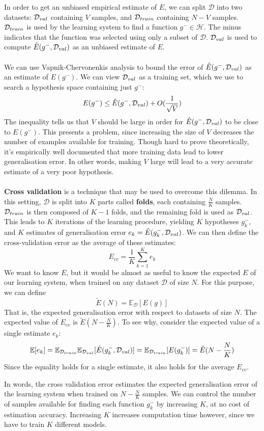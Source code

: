 In order to get an unbiased empirical estimate of $E$, we can split $\mathcal{D}$ into two datasets: $\mathcal{D}_{val}$ containing $V$ samples, and $\mathcal{D}_{train}$ containing $N - V$ samples. $\mathcal{D}_{train}$ is used by the learning system to find a function $g^- \in \mathcal{H}$. The minus indicates that the function was selected using only a subset of $\mathcal{D}$. $\mathcal{D}_{val}$ is used to compute $\hat{E}(g^-, \mathcal{D}_{val})$ as an unbiased estimate of $E$.
\\\\
We can use Vapnik-Chervonenkis analysis to bound the error of $\hat{E}(g^-, \mathcal{D}_{val})$ as an estimate of $E(g^-)$. We can view $\mathcal{D}_{val}$ as a training set, which we use to search a hypothesis space containing just $g^-$:
$$
E(g^-) \leq \hat{E}(g^-, \mathcal{D}_{val}) + O(\frac{1}{\sqrt{V}})
$$
The inequality tells us that $V$ should be large in order for $\hat{E}(g^-, \mathcal{D}_{val})$ to be close to $E(g^-)$. This presents a problem, since increasing the size of $V$ decreases the number of examples available for training. Though hard to prove theoretically, it's empirically well documented that more training data lead to lower generalisation error. In other words, making $V$ large will lead to a very accurate estimate of a very poor hypothesis.
\\\\
\textbf{Cross validation} is a technique that may be used to overcome this dilemma. In this setting, $\mathcal{D}$ is split into $K$ parts called \textbf{folds}, each containing $\frac{N}{K}$ samples. $\mathcal{D}_{train}$ is then composed of $K - 1$ folds, and the remaining fold is used as $\mathcal{D}_{val}$. This leads to $K$ iterations of the learning procedure, yielding $K$ hypotheses $g^-_k$, and $K$ estimates of generalisation error $e_k = \hat{E}(g^-_k, \mathcal{D}_{val})$. We can then define the cross-validation error as the average of these estimates:
$$
E_{cv} = \frac{1}{K}\sum\limits_{k=1}^K e_k
$$
We want to know $E$, but it would be almost as useful to know the expected $E$ of our learning system, when trained on any dataset $\mathcal{D}$ of size $N$. For this purpose, we can define 
$$
\tilde{E}(N) = \mathbb{E}_{\mathcal{D}}[E(g)]
$$
That is, the expected generalisation error with respect to datasets of size $N$. The expected value of $E_{cv}$ is $\tilde{E}(N - \frac{N}{K})$. To see why, consider the expected value of a single estimate $e_k$:
$$
\mathbb{E}[e_k] = \mathbb{E}_{\mathcal{D}_{train}}\mathbb{E}_{\mathcal{D}_{val}}[\hat{E}(g^-_k, \mathcal{D}_{val})] = \mathbb{E}_{\mathcal{D}_{train}}[E(g^-_k)] = \tilde{E}(N - \frac{N}{K})
$$
Since the equality holds for a single estimate, it also holds for the average $E_{cv}$.

In words, the cross validation error estimates the expected generalisation error of the learning system when trained on $N - \frac{N}{K}$ samples. We can control the number of samples available for finding each function $g^-_k$ by increasing $K$, at no cost of estimation accuracy. Increasing $K$ increases computation time however, since we have to train $K$ different models.